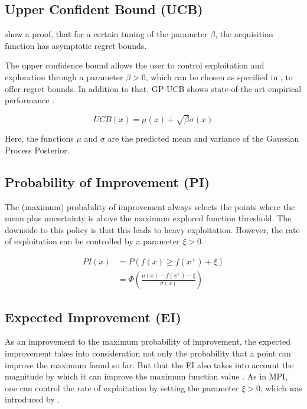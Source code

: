 \subsection{Upper Confident Bound (UCB)}
\citep{UCBRegretProof} show a proof, that for a certain tuning of the parameter $\beta$, the acquisition function has asymptotic regret bounds.

The upper confidence bound allows the user to control exploitation and exploration through a parameter $\beta > 0$, which can be chosen as specified in \citep{UCBRegretProof} , to offer regret bounds.
In addition to that, GP-UCB shows state-of-the-art empirical performance \citep{Djolonga2013}.

\begin{equation}
UCB(x) = \mu(x) + \sqrt{ \beta } \sigma(x)
\end{equation}

Here, the functions $\mu$ and $\sigma$ are the predicted mean and variance of the Gaussian Process Posterior.

\subsection{Probability of Improvement (PI)}
The (maximum) probability of improvement \citep{AcquisitionFunctions} always selects the points where the mean plus uncertainty is above the maximum explored function threshold. 
The downside to this policy is that this leads to heavy exploitation.
However, the rate of exploitation can be controlled by a parameter $\xi > 0$.

\begin{align}
    PI(x) & = P( f(x) \geq f(x^+) + \xi ) \\
    & = \Phi ( \frac{\mu(x) - f(x^+) - \xi}{\sigma(x)}  ) 
\end{align}


\subsection{Expected Improvement (EI)}
As an improvement to the maximum probability of improvement, the expected improvement takes into consideration not only the probability that a point can improve the maximum found so far.
But that the EI also takes into account the magnitude by which it can improve the maximum function value \citep{AcquisitionFunctions}.
As in MPI, one can control the rate of exploitation by setting the parameter $\xi > 0$, which was introduced by \citep{Lizotte2008}.

